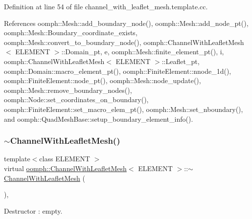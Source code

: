 Definition at line 54 of file channel\+\_\+with\+\_\+leaflet\+\_\+mesh.\+template.\+cc.



References oomph\+::\+Mesh\+::add\+\_\+boundary\+\_\+node(), oomph\+::\+Mesh\+::add\+\_\+node\+\_\+pt(), oomph\+::\+Mesh\+::\+Boundary\+\_\+coordinate\+\_\+exists, oomph\+::\+Mesh\+::convert\+\_\+to\+\_\+boundary\+\_\+node(), oomph\+::\+Channel\+With\+Leaflet\+Mesh$<$ E\+L\+E\+M\+E\+N\+T $>$\+::\+Domain\+\_\+pt, e, oomph\+::\+Mesh\+::finite\+\_\+element\+\_\+pt(), i, oomph\+::\+Channel\+With\+Leaflet\+Mesh$<$ E\+L\+E\+M\+E\+N\+T $>$\+::\+Leaflet\+\_\+pt, oomph\+::\+Domain\+::macro\+\_\+element\+\_\+pt(), oomph\+::\+Finite\+Element\+::nnode\+\_\+1d(), oomph\+::\+Finite\+Element\+::node\+\_\+pt(), oomph\+::\+Mesh\+::node\+\_\+update(), oomph\+::\+Mesh\+::remove\+\_\+boundary\+\_\+nodes(), oomph\+::\+Node\+::set\+\_\+coordinates\+\_\+on\+\_\+boundary(), oomph\+::\+Finite\+Element\+::set\+\_\+macro\+\_\+elem\+\_\+pt(), oomph\+::\+Mesh\+::set\+\_\+nboundary(), and oomph\+::\+Quad\+Mesh\+Base\+::setup\+\_\+boundary\+\_\+element\+\_\+info().

\mbox{\label{classoomph_1_1ChannelWithLeafletMesh_ad767dc06cf65becc207f780f8100657c}} 
\subsubsection{\texorpdfstring{$\sim$\+Channel\+With\+Leaflet\+Mesh()}{~ChannelWithLeafletMesh()}}
{\footnotesize\ttfamily template$<$class E\+L\+E\+M\+E\+NT $>$ \\
virtual \hyperlink{classoomph_1_1ChannelWithLeafletMesh}{oomph\+::\+Channel\+With\+Leaflet\+Mesh}$<$ E\+L\+E\+M\+E\+NT $>$\+::$\sim$\hyperlink{classoomph_1_1ChannelWithLeafletMesh}{Channel\+With\+Leaflet\+Mesh} (\begin{DoxyParamCaption}{ }\end{DoxyParamCaption})\hspace{0.3cm}{\ttfamily [inline]}, {\ttfamily [virtual]}}



Destructor \+: empty. 



